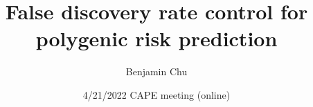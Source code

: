 \documentclass[aspectratio=169, 10pt]{beamer}
\title[]{False discovery rate control for polygenic risk prediction}
\author[Benjamin Chu]{Benjamin Chu}
\date{4/21/2022 CAPE meeting (online)}
\newcommand\blfootnote[1]{%
\begingroup
\renewcommand\thefootnote{}\footnote{#1}%
\addtocounter{footnote}{-1}%
\endgroup
}
\begin{document}
\frame{\titlepage}


\end{document}
